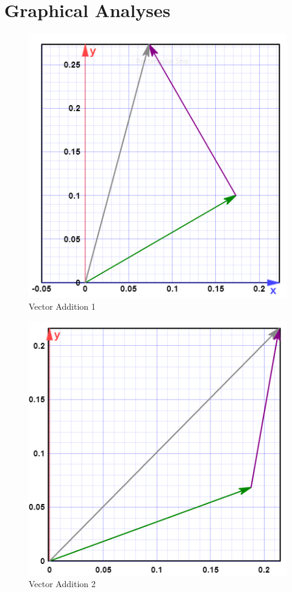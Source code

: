 \documentclass[11pt, titlepage]{article}
\begin{document}
\section*{Graphical Analyses}
\begin{figure}
\includegraphics[scale=.5, angle=0]{lab03_v1.png}
\caption{Vector Addition 1 \label{fig:v1}}
\end{figure}
\begin{figure}
\includegraphics[scale=.5, angle=0]{lab03_v2.png}
\caption{Vector Addition 2 \label{fig:v2}}
\end{figure}
\end{document}
